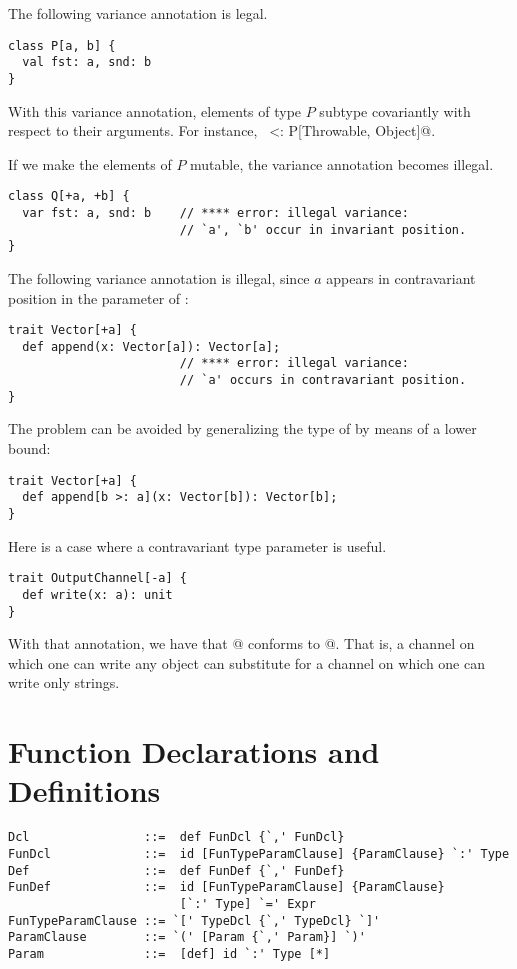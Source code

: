 \documentclass[a4paper,12pt,twoside,titlepage]{book}
\begin{document}
\example The following variance annotation is legal. 
\begin{lstlisting}
class P[a, b] {
  val fst: a, snd: b
}\end{lstlisting}
With this variance annotation, elements
of type $P$ subtype covariantly with respect to their arguments. 
For instance, ~ <: P[Throwable, Object]@.

If we make the elements of $P$ mutable, 
the variance annotation becomes illegal. 
\begin{lstlisting}
class Q[+a, +b] { 
  var fst: a, snd: b    // **** error: illegal variance:
                        // `a', `b' occur in invariant position.
}
\end{lstlisting}

\example The following variance annotation is illegal, since $a$ appears
in contravariant position in the parameter of :

\begin{lstlisting}
trait Vector[+a] {
  def append(x: Vector[a]): Vector[a]; 
                        // **** error: illegal variance: 
                        // `a' occurs in contravariant position.
}
\end{lstlisting} 
The problem can be avoided by generalizing the type of 
by means of a lower bound:

\begin{lstlisting}
trait Vector[+a] {
  def append[b >: a](x: Vector[b]): Vector[b];
}
\end{lstlisting}

\example Here is a case where a contravariant type parameter is useful.

\begin{lstlisting}
trait OutputChannel[-a] {
  def write(x: a): unit
}
\end{lstlisting}
With that annotation, we have that
\lstinline@OutputChannel[Object]@ conforms to \lstinline@OutputChannel[String]@.  
That is, a
channel on which one can write any object can substitute for a channel
on which one can write only strings.

\section{Function Declarations and Definitions}
\label{sec:defdef}
\label{sec:funsigs}

\syntax\begin{lstlisting} 
Dcl                ::=  def FunDcl {`,' FunDcl} 
FunDcl             ::=  id [FunTypeParamClause] {ParamClause} `:' Type 
Def                ::=  def FunDef {`,' FunDef} 
FunDef             ::=  id [FunTypeParamClause] {ParamClause} 
                        [`:' Type] `=' Expr 
FunTypeParamClause ::= `[' TypeDcl {`,' TypeDcl} `]' 
ParamClause        ::= `(' [Param {`,' Param}] `)' 
Param              ::=  [def] id `:' Type [*]
\end{lstlisting}
\end{document}
